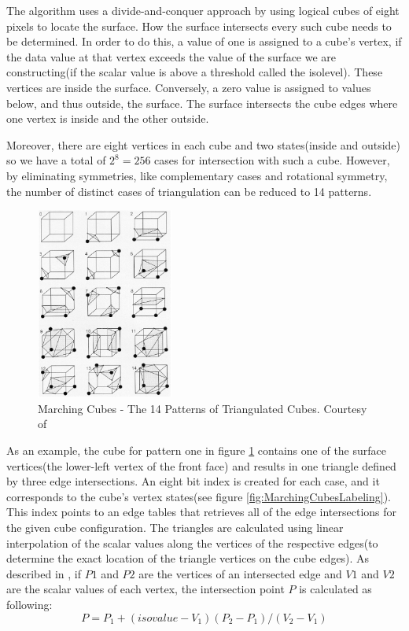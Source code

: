 \documentclass[]{article}
\begin{document}
The algorithm uses a divide-and-conquer approach by using logical cubes of eight pixels to locate the surface. How the surface intersects every such cube needs to be determined. In order to do this, a value of one is assigned to a cube's vertex, if the data value at that vertex exceeds the value of the surface we are constructing(if the scalar value is above a threshold called the isolevel). These vertices are inside the surface. Conversely, a zero value is assigned to values below, and thus outside, the surface. The surface intersects the cube edges where one vertex is inside and the other outside.

Moreover, there are eight vertices in each cube and two states(inside and outside) so we have a total of $2^{8} = 256$ cases for intersection with such a cube. However, by eliminating symmetries, like complementary cases and rotational symmetry, the number of distinct cases of triangulation can be reduced to 14 patterns.

\begin{figure}[hbtp]
    \centering
    \includegraphics[width=0.4\textwidth]{figures/MarchingCubesTriagulationCases.PNG}
    \caption{Marching Cubes - The 14 Patterns of Triangulated Cubes. Courtesy of \cite{william87}}
    \label{fig:MarchingCubesTrianglatedCubes}
\end{figure}

As an example, the cube for pattern one in figure \ref{fig:MarchingCubesTrianglatedCubes} contains one  of the surface vertices(the lower-left vertex of the front face) and results in one triangle defined by three edge intersections. An eight bit index is created for each case, and it corresponds to the cube's vertex states(see figure \ref{fig:MarchingCubesLabeling}). This index points to an edge tables that retrieves all of the edge intersections for the given cube configuration. The triangles are calculated using linear interpolation of the scalar values along the vertices of the respective edges(to determine the exact location of the triangle vertices on the cube edges). As described in \cite{navpreet2013}, if $P1$ and $P2$ are the vertices of an intersected edge and $V1$ and $V2$ are the scalar values of each vertex, the intersection point $P$ is calculated as following:  
	$$P = P_{1} + (isovalue - V_{1})(P_{2} - P_{1}) / (V_{2} - V_{1})$$
\end{document}

